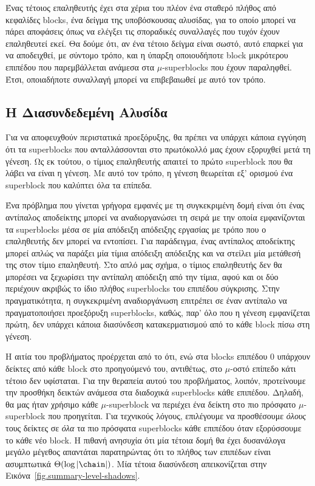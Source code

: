 Ένας τέτοιος επαληθευτής έχει στα χέρια του πλέον ένα σταθερό πλήθος από κεφαλίδες blocks,
ένα δείγμα της υποβόσκουσας αλυσίδας, για το οποίο μπορεί να πάρει αποφάσεις όπως να ελέγξει
τις σποραδικές συναλλαγές που τυχόν έχουν επαληθευτεί εκεί. Θα δούμε ότι, αν ένα τέτοιο δείγμα
είναι σωστό, αυτό επαρκεί για να αποδειχθεί, με σύντομο τρόπο, και η ύπαρξη οποιουδήποτε block
μικρότερου επιπέδου που παρεμβάλλεται ανάμεσα στα $\mu$-superblocks που έχουν παραληφθεί. Έτσι,
οποιαδήποτε συναλλαγή μπορεί να επιβεβαιωθεί με αυτό τον τρόπο.

\subsection*{Η Διασυνδεδεμένη Αλυσίδα}
Για να αποφευχθούν περιστατικά προεξόρυξης, θα πρέπει να υπάρχει κάποια εγγύηση
ότι τα superblocks που ανταλλάσσονται στο πρωτόκολλό μας έχουν εξορυχθεί μετά τη γένεση. Ως εκ τούτου,
ο τίμιος επαληθευτής απαιτεί το πρώτο superblock που θα λάβει να είναι η γένεση. Με αυτό τον τρόπο, η
γένεση θεωρείται εξ' ορισμού ένα superblock που καλύπτει όλα τα επίπεδα.

Ένα πρόβλημα που γίνεται γρήγορα εμφανές με τη συγκεκριμένη δομή είναι ότι ένας αντίπαλος αποδείκτης
μπορεί να αναδιοργανώσει τη σειρά με την οποία εμφανίζονται τα superblocks μέσα σε μία απόδειξη απόδειξης
εργασίας με τρόπο που ο επαληθευτής δεν μπορεί να εντοπίσει. Για παράδειγμα, ένας αντίπαλος αποδείκτης
μπορεί απλώς να παράξει μία τίμια απόδειξη απόδειξης και να στείλει μία μετάθεσή της στον τίμιο επαληθευτή.
Στο απλό μας σχήμα, ο τίμιος επαληθευτής δεν θα μπορέσει να ξεχωρίσει την αντίπαλη απόδειξη από
την τίμια, αφού και οι δύο περιέχουν ακριβώς το ίδιο πλήθος superblocks του επιπέδου
σύγκρισης. Στην πραγματικότητα, η συγκεκριμένη αναδιοργάνωση επιτρέπει σε έναν αντίπαλο να πραγματοποιήσει
προεξόρυξη superblocks, καθώς, παρ' όλο που η γένεση εμφανίζεται πρώτη, δεν υπάρχει κάποια διασύνδεση
κατακερματισμού από το κάθε block πίσω στη γένεση.

Η αιτία του προβλήματος προέρχεται από το ότι, ενώ στα blocks επιπέδου $0$ υπάρχουν δείκτες από κάθε
block στο προηγούμενό του, αντιθέτως, στο $\mu$-οστό επίπεδο κάτι τέτοιο δεν υφίσταται. Για την
θεραπεία αυτού του προβλήματος, λοιπόν, προτείνουμε την προσθήκη δεικτών ανάμεσα στα διαδοχικά
superblocks κάθε επιπέδου. Δηλαδή, θα μας ήταν χρήσιμο κάθε $\mu$-superblock να περιέχει ένα δείκτη
στο πιο πρόσφατο $\mu$-superblock που προηγείται. Για τεχνικούς λόγους, επιλέγουμε να
προσθέσουμε \emph{όλους} τους δείκτες σε \emph{όλα} τα πιο πρόσφατα superblocks κάθε επιπέδου όταν
εξορύσσουμε το κάθε νέο block.
Η πιθανή ανησυχία ότι μία τέτοια δομή θα έχει δυσανάλογα μεγάλο μέγεθος απαντάται παρατηρώντας ότι
το πλήθος των επιπέδων είναι ασυμπτωτικά $\Theta(\log |\chain|)$.
Μία τέτοια διασύνδεση απεικονίζεται στην Εικόνα~\ref{fig.summary-level-shadows}.


